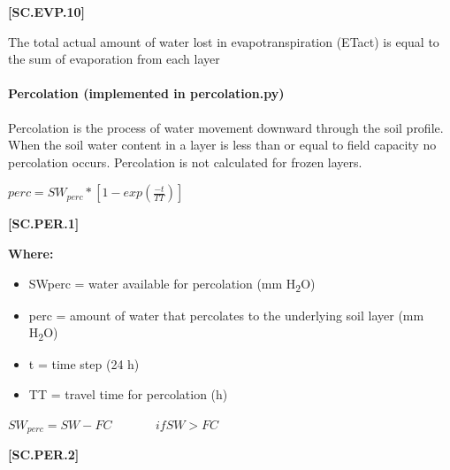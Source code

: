             {\raggedleft \textbf{[SC.EVP.10]}\par}
            \vspace{0.5cm}

The total actual amount of water lost in evapotranspiration (ETact) is equal to the sum of evaporation from each layer

\paragraph{Percolation (implemented in percolation.py)}


Percolation is the process of water movement downward through the soil profile. When the soil water content in a layer is less than or equal to field capacity no percolation occurs. Percolation is not calculated for frozen layers.  \vspace{0.5cm}

    \begin{center}
 \(perc=SW_{perc} * [1-exp(\frac{-t}{TT})]\)
    \end{center}
        \vspace{0.5cm} 
    
            {\raggedleft \textbf{[SC.PER.1]}\par}
            \vspace{0.5cm}

        \textbf{Where:}
            
        \begin{itemize}
            \item SWperc	=	water available for percolation (mm H\textsubscript{2}O)
            \item perc		=	amount of water that percolates to the underlying soil layer (mm H\textsubscript{2}O)
            \item t		=	time step (24 h)
            \item TT =	travel time for percolation (h)

        \end{itemize}
    \vspace{0.2cm}

    \begin{center}
 \(SW_{perc}=SW-FC \ \ \ \ \ \ \ \ \ \ \ \ \ \ \ \ if SW>FC\)
    \end{center}
        \vspace{0.5cm} 
    
            {\raggedleft \textbf{[SC.PER.2]}\par}
            \vspace{0.5cm}
            
